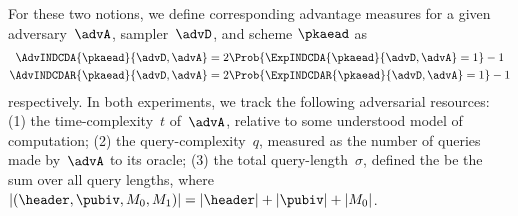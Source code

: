 For these two notions, we define corresponding advantage measures for a given adversary~$\advA$, sampler~$\advD$, and scheme $\pkaead$ as
\begin{align*}
\AdvINDCDA{\pkaead}{\advD,\advA}&=2\Prob{\ExpINDCDA{\pkaead}{\advD,\advA}=1}-1\\ \AdvINDCDAR{\pkaead}{\advD,\advA}&=2\Prob{\ExpINDCDAR{\pkaead}{\advD,\advA}=1}-1
\end{align*}
respectively.  In both experiments, we track the following adversarial resources: (1) the time-complexity~$t$ of~$\advA$, relative to some understood model of computation; (2) the query-complexity~$q$, measured as the number of queries made by~$\advA$ to its oracle; (3) the total query-length~$\sigma$, defined the be the sum over all query lengths, where $|(\header,\pubiv,M_0,M_1)|=|\header|+|\pubiv|+|M_0|$.


